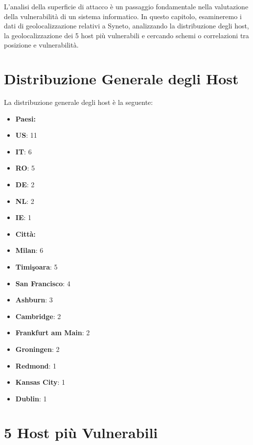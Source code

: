 L'analisi della superficie di attacco è un passaggio fondamentale nella valutazione della vulnerabilità di un sistema informatico. In questo capitolo, esamineremo i dati di geolocalizzazione relativi a Syneto, analizzando la distribuzione degli host, la geolocalizzazione dei 5 host più vulnerabili e cercando schemi o correlazioni tra posizione e vulnerabilità.

\section{Distribuzione Generale degli Host}

La distribuzione generale degli host è la seguente:
\begin{itemize}
\item \textbf{Paesi:}
\item \textbf{US}: 11
\item \textbf{IT}: 6
\item \textbf{RO}: 5
\item \textbf{DE}: 2
\item \textbf{NL}: 2
\item \textbf{IE}: 1
\item \textbf{Città:}
\item \textbf{Milan}: 6
\item \textbf{Timişoara}: 5
\item \textbf{San Francisco}: 4
\item \textbf{Ashburn}: 3
\item \textbf{Cambridge}: 2
\item \textbf{Frankfurt am Main}: 2
\item \textbf{Groningen}: 2
\item \textbf{Redmond}: 1
\item \textbf{Kansas City}: 1
\item \textbf{Dublin}: 1
\end{itemize}
\section{5 Host più Vulnerabili}

